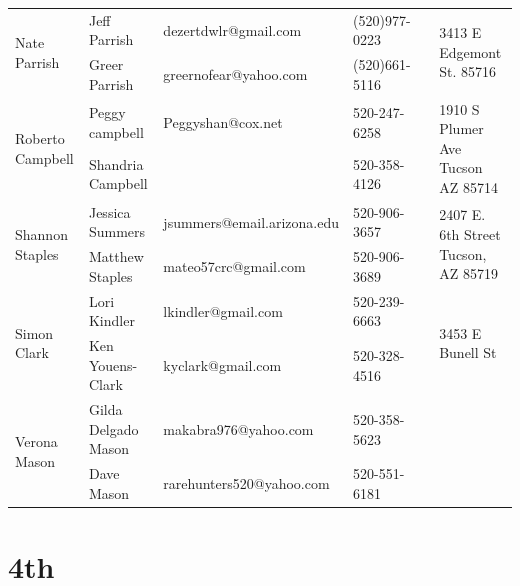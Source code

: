 \documentclass[landscape]{article}\usepackage[]{graphicx}\usepackage[]{color}
\begin{document}
\begin{longtable}{|p{100pt}|p{100pt}|p{140pt}|p{60pt}|p{64pt}|p{120pt}|}
\hline
\multirow{2}{100pt}{Nate Parrish} & Jeff Parrish & dezertdwlr@gmail.com & (520)977-0223 &  & \multirow{2}{120pt}{3413 E Edgemont St. 85716} \\
 & Greer Parrish & greernofear@yahoo.com & (520)661-5116 &  & \\
\hline
\multirow{2}{100pt}{Roberto Campbell} & Peggy campbell & Peggyshan@cox.net & 520-247-6258 &  & \multirow{2}{120pt}{1910 S Plumer Ave Tucson AZ 85714} \\
 & Shandria Campbell  &  & 520-358-4126 &  & \\
\hline
\multirow{2}{100pt}{Shannon Staples} & Jessica Summers & jsummers@email.arizona.edu & 520-906-3657 &  & \multirow{2}{120pt}{2407 E. 6th Street Tucson, AZ  85719} \\
 & Matthew Staples & mateo57crc@gmail.com & 520-906-3689 &  & \\
\hline
\multirow{2}{100pt}{Simon Clark} & Lori Kindler & lkindler@gmail.com & 520-239-6663 &  & \multirow{2}{120pt}{3453 E Bunell St} \\
 & Ken Youens-Clark & kyclark@gmail.com & 520-328-4516 &  & \\
\hline
\multirow{2}{100pt}{Verona Mason} & Gilda Delgado Mason & makabra976@yahoo.com & 520-358-5623 &  & \multirow{2}{120pt}{} \\
 & Dave Mason & rarehunters520@yahoo.com & 520-551-6181 &  & \\
\hline
\end{longtable}
\newpage
\section{4th}
\end{document}
